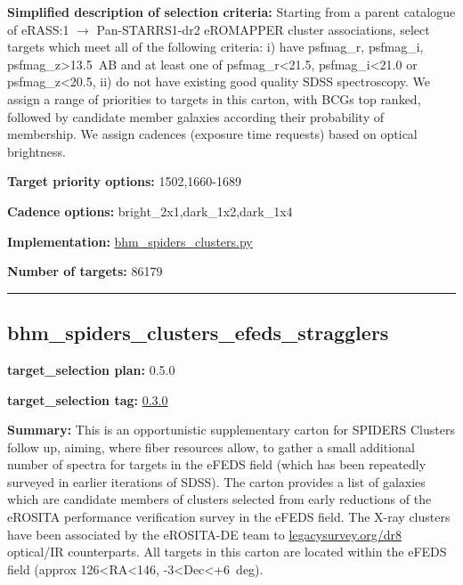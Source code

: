 \noindent\textbf{Simplified description of selection criteria:} Starting from a
parent catalogue of eRASS:1 $\rightarrow$ Pan-STARRS1-dr2 eROMAPPER cluster
associations, select targets which meet all of the following criteria:
i) have psfmag\_r, psfmag\_i, psfmag\_z\textgreater{}13.5~AB and at
least one of psfmag\_r\textless{}21.5, psfmag\_i\textless{}21.0 or
psfmag\_z\textless{}20.5, ii) do not have existing good quality SDSS
spectroscopy. We assign a range of priorities to targets in this carton,
with BCGs top ranked, followed by candidate member galaxies according
their probability of membership. We assign cadences (exposure time
requests) based on optical brightness.


\noindent\textbf{Target priority options:} 1502,1660-1689

\noindent\textbf{Cadence options:} bright\_2x1,dark\_1x2,dark\_1x4

\noindent\textbf{Implementation:}
\href{https://github.com/sdss/target_selection/blob/0.3.0/python/target_selection/cartons/bhm_spiders_clusters.py}{bhm\_spiders\_clusters.py}

\noindent\textbf{Number of targets:} 86179

\begin{center}\rule{0.5\linewidth}{0.5pt}\end{center}

\hypertarget{bhm_spiders_clusters_efeds_stragglers_plan0.5.0}{%
\subsection{bhm\_spiders\_clusters\_efeds\_stragglers}\label{bhm_spiders_clusters_efeds_stragglers_plan0.5.0}}

\noindent\textbf{target\_selection plan:} 0.5.0

\noindent\textbf{target\_selection tag:}
\href{https://github.com/sdss/target_selection/tree/0.3.0/}{0.3.0}

\noindent\textbf{Summary:} This is an opportunistic supplementary carton for
SPIDERS Clusters follow up, aiming, where fiber resources allow, to
gather a small additional number of spectra for targets in the eFEDS
field (which has been repeatedly surveyed in earlier iterations of
SDSS). The carton provides a list of galaxies which are candidate
members of clusters selected from early reductions of the eROSITA
performance verification survey in the eFEDS field. The X-ray clusters
have been associated by the eROSITA-DE team to
\href{https://www.legacysurvey.org/dr8/}{legacysurvey.org/dr8}
optical/IR counterparts. All targets in this carton are located within
the eFEDS field (approx 126\textless{}RA\textless{}146,
-3\textless{}Dec\textless{}+6~deg).

